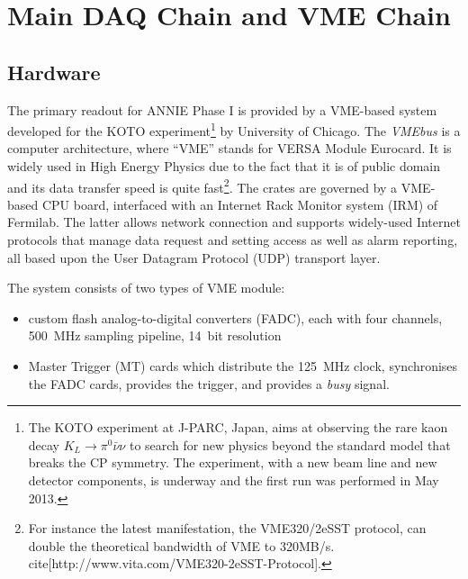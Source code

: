  \section{Main DAQ Chain and VME Chain}
 \label{sec:main}
 
 \subsection{Hardware}
 \label{sec:main_h}
 
 The primary readout for ANNIE Phase I is provided by a VME-based system developed for the KOTO %
 experiment\footnote{The KOTO experiment at J-PARC, Japan, aims at observing the rare kaon decay %
   $K_L\rightarrow \pi^0 \bar{\nu} \nu$ to search for new physics beyond the standard model that %
   breaks the CP symmetry. The experiment, with a new beam line and new detector components, is %
   underway and the first run was performed in May 2013.} %
 by University of Chicago.
 The \emph{VMEbus} is a computer architecture, where ``VME'' stands for VERSA Module Eurocard.
 It is widely used in High Energy Physics due to the fact that it is of public domain and %
 its data transfer speed is quite fast\footnote{For instance the latest manifestation, %
 the VME320/2eSST protocol, can double the theoretical bandwidth of VME to 320MB/s.
 cite[http://www.vita.com/VME320-2eSST-Protocol].}.
 The crates are governed by a VME-based CPU board, interfaced with an Internet Rack Monitor system (IRM) %
 of Fermilab.
 The latter allows network connection and supports widely-used Internet protocols that manage data request %
 and setting access as well as alarm reporting, all based upon the User Datagram Protocol (UDP) transport layer.
 
 The system consists of two types of VME module:
 \begin{itemize}
   \item custom flash analog-to-digital converters (FADC), each with four channels, 500~MHz sampling pipeline, 14~bit %
     resolution
   \item Master Trigger (MT) cards which distribute the 125~MHz clock, synchronises the FADC %
     cards, provides the trigger, and provides a \emph{busy} signal.
 \end{itemize}
 
